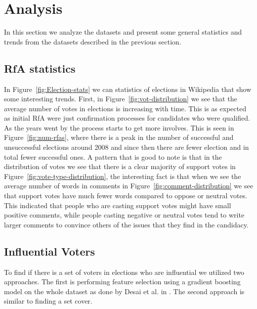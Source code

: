 \section{Analysis}
In this section we analyze the datasets and present some general statistics and trends from the datasets described in the previous section.

\subsection{RfA statistics}
In Figure~\ref{fig:Election-stats} we can statistics of elections in Wikipedia that show some interesting trends. First, in Figure~\ref{fig:vot-distribution} we see that the average number of votes in elections is increasing with time. This is as expected as initial RfA were just confirmation processes for candidates who were qualified. As the years went by the process starts to get more involves. This is seen in Figure~\ref{fig:num-rfas}, where there is a peak in the number of successful and unsuccessful elections around 2008 and since then there are fewer election and in total fewer successful ones. A pattern that is good to note is that in the distribution of votes we see that there is a clear majority of support votes in Figure~\ref{fig:vote-type-distribution}, the interesting fact is that when we see the average number of words in comments in Figure~\ref{fig:comment-distribution} we see that support votes have much fewer words compared to oppose or neutral votes. This indicated that people who are casting support votes might have small positive comments, while people casting negative or neutral votes tend to write larger comments to convince others of the issues that they find in the candidacy.

\subsection{Influential Voters}
\label{sec:influential-voters}
To find if there is a set of voters in elections who are influential we utilized two approaches. The first is performing feature selection using a gradient boosting model on the whole dataset as done by Desai et al. in \cite{desai2014result}. The second approach is similar to finding a set cover.

